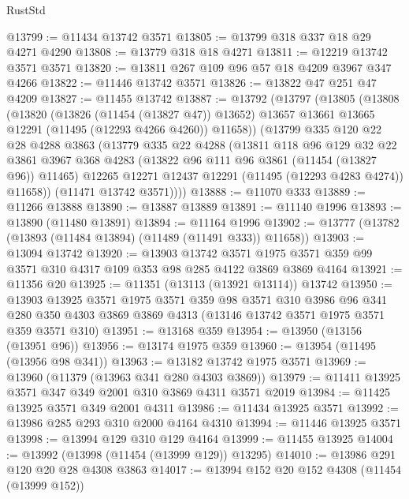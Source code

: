 \begin{lexlean}{RustStd}
\begin{coremodule}
@13799 := @11434 @13742 @3571
@13805 := @13799 @318 @337 @18 @29 @4271 @4290
@13808 := @13779 @318 @18 @4271
@13811 := @12219 @13742 @3571 @3571
@13820 := @13811 @267 @109 @96 @57 @18 @4209 @3967 @347 @4266
@13822 := @11446 @13742 @3571
@13826 := @13822 @47 @251 @47 @4209
@13827 := @11455 @13742
@13887 := @13792
    (@13797
      (@13805
        (@13808
          (@13820
            (@13826 (@11454 (@13827 @47)) @13652)
            @13657
            @13661
            @13665
            @12291
            (@11495 (@12293 @4266 @4260))
            @11658))
        (@13799
          @335
          @120
          @22
          @28
          @4288
          @3863
          (@13779
            @335
            @22
            @4288
            (@13811
              @118
              @96
              @129
              @32
              @22
              @3861
              @3967
              @368
              @4283
              (@13822 @96 @111 @96 @3861 (@11454 (@13827 @96)) @11465)
              @12265
              @12271
              @12437
              @12291
              (@11495 (@12293 @4283 @4274))
              @11658))
          (@11471 @13742 @3571))))
@13888 := @11070 @333
@13889 := @11266 @13888
@13890 := @13887 @13889
@13891 := @11140 @1996
@13893 := @13890 (@11480 @13891)
@13894 := @11164 @1996
@13902 := @13777 (@13782 (@13893 (@11484 @13894) (@11489 (@11491 @333)) @11658))
@13903 := @13094 @13742
@13920 := @13903
    @13742
    @3571
    @1975
    @3571
    @359
    @99
    @3571
    @310
    @4317
    @109
    @353
    @98
    @285
    @4122
    @3869
    @3869
    @4164
@13921 := @11356 @20
@13925 := @11351 (@13113 (@13921 @13114)) @13742
@13950 := @13903
    @13925
    @3571
    @1975
    @3571
    @359
    @98
    @3571
    @310
    @3986
    @96
    @341
    @280
    @350
    @4303
    @3869
    @3869
    @4313
    (@13146 @13742 @3571 @1975 @3571 @359 @3571 @310)
@13951 := @13168 @359
@13954 := @13950 (@13156 (@13951 @96))
@13956 := @13174 @1975 @359
@13960 := @13954 (@11495 (@13956 @98 @341))
@13963 := @13182 @13742 @1975 @3571
@13969 := @13960 (@11379 (@13963 @341 @280 @4303 @3869))
@13979 := @11411 @13925 @3571 @347 @349 @2001 @310 @3869 @4311 @3571 @2019
@13984 := @11425 @13925 @3571 @349 @2001 @4311
@13986 := @11434 @13925 @3571
@13992 := @13986 @285 @293 @310 @2000 @4164 @4310
@13994 := @11446 @13925 @3571
@13998 := @13994 @129 @310 @129 @4164
@13999 := @11455 @13925
@14004 := @13992 (@13998 (@11454 (@13999 @129)) @13295)
@14010 := @13986 @291 @120 @20 @28 @4308 @3863
@14017 := @13994 @152 @20 @152 @4308 (@11454 (@13999 @152))

\end{coremodule}
\end{lexlean}
